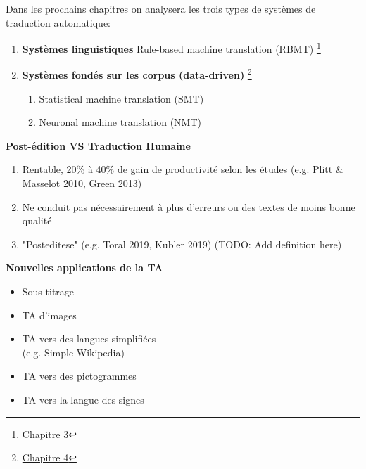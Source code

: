 \noindent Dans les prochains chapitres on analysera les trois types de systèmes de traduction automatique:

\begin{enumerate}
    \item \textbf{Systèmes linguistiques} Rule-based machine translation (RBMT) \footnote{\hyperref[sec:RBMT]{Chapitre 3}}
    \item \textbf{Systèmes fondés sur les corpus (data-driven)} \footnote{\hyperref[sec:corpus]{Chapitre 4}}
    \begin{enumerate}
        \item Statistical machine translation (SMT)
        \item Neuronal machine translation (NMT) \\
    \end{enumerate}
\end{enumerate}

\noindent\textbf{Post-édition VS Traduction Humaine}
\begin{enumerate}
    \item Rentable, 20\% à 40\% de gain de productivité selon les études (e.g. Plitt \& Masselot 2010, Green 2013)
    \item Ne conduit pas nécessairement à plus d'erreurs ou des textes de moins bonne qualité
    \item "Posteditese" (e.g. Toral 2019, Kubler 2019) (TODO: Add definition here)
\end{enumerate}

\noindent\textbf{Nouvelles applications de la TA\\}

\begin{minipage}[t]{0.5\textwidth}
\begin{itemize}
\item Sous-titrage
\item TA d'images
\item TA vers des langues simplifiées \\(e.g. Simple Wikipedia)\\
\end{itemize}
\end{minipage}
\begin{minipage}[t]{0.5\textwidth}
\begin{itemize}
\item TA vers des pictogrammes
\item TA vers la langue des signes
\end{itemize}
\end{minipage}

